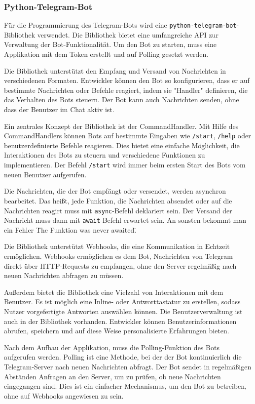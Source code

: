 \documentclass[12pt, letterpaper]{article}
\begin{document}
\subsubsection{Python-Telegram-Bot}
\label{sec:telegram-bot}
\par Für die Programmierung des Telegram-Bots wird eine \texttt{python-telegram-bot}-Bibliothek verwendet. Die Bibliothek bietet eine umfangreiche API zur Verwaltung der Bot-Funktionalität. Um den Bot zu starten, muss eine Applikation mit dem Token erstellt und auf Polling gesetzt werden.
\par Die Bibliothek unterstützt den Empfang und Versand von Nachrichten in verschiedenen Formaten. Entwickler können den Bot so konfigurieren, dass er auf bestimmte Nachrichten oder Befehle reagiert, indem sie "Handler" definieren, die das Verhalten des Bots steuern. Der Bot kann auch Nachrichten senden, ohne dass der Benutzer im Chat aktiv ist.
\par Ein zentrales Konzept der Bibliothek ist der CommandHandler. Mit Hilfe des CommandHandlers können Bots auf bestimmte Eingaben wie \texttt{/start}, \texttt{/help} oder benutzerdefinierte Befehle reagieren. Dies bietet eine einfache Möglichkeit, die Interaktionen des Bots zu steuern und verschiedene Funktionen zu implementieren. Der Befehl \texttt{/start} wird immer beim ersten Start des Bots vom neuen Benutzer aufgerufen.
\par Die Nachrichten, die der Bot empfängt oder versendet, werden asynchron bearbeitet. Das heißt, jede Funktion, die Nachrichten absendet oder auf die Nachrichten reagirt muss mit \texttt{async}-Befehl deklariert sein. Der Versand der Nachricht muss dann mit \texttt{await}-Befehl erwartet sein. An sonsten bekommt man ein Fehler \"The Funktion was never awaited\".
\par Die Bibliothek unterstützt Webhooks, die eine Kommunikation in Echtzeit ermöglichen. Webhooks ermöglichen es dem Bot, Nachrichten von Telegram direkt über HTTP-Requests zu empfangen, ohne den Server regelmäßig nach neuen Nachrichten abfragen zu müssen.
\par Außerdem bietet die Bibliothek eine Vielzahl von Interaktionen mit dem Benutzer. Es ist möglich eine Inline- oder Antworttastatur zu erstellen, sodass Nutzer vorgefertigte Antworten auswählen können. Die Benutzerverwaltung ist auch in der Bibliothek vorhanden. Entwickler können Benutzerinformationen abrufen, speichern und auf diese Weise personalisierte Erfahrungen bieten.
\par Nach dem Aufbau der Applikation, muss die Polling-Funktion des Bots aufgerufen werden. Polling ist eine Methode, bei der der Bot kontinuierlich die Telegram-Server nach neuen Nachrichten abfragt. Der Bot sendet in regelmäßigen Abständen Anfragen an den Server, um zu prüfen, ob neue Nachrichten eingegangen sind. Dies ist ein einfacher Mechanismus, um den Bot zu betreiben, ohne auf Webhooks angewiesen zu sein.
\end{document}
